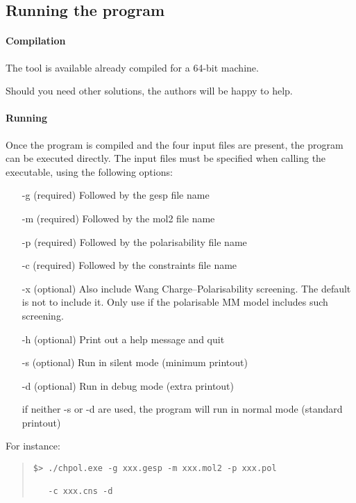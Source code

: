 \documentclass[a4paper]{report}
\begin{document}
\subsection*{Running the program}

\paragraph*{Compilation}

The tool is available already compiled for a 64-bit machine.

Should you need other solutions, the authors will be happy to help.

\paragraph*{Running}

Once the program is compiled and the four input files are present, the program can
be executed directly. The input files must be specified when calling the executable,
using the following options:
\begin{itemize}
\item[-g] (required) Followed by the gesp file name
\item[-m] (required) Followed by the mol2 file name
\item[-p] (required) Followed by the polarisability file name
\item[-c] (required) Followed by the constraints file name
\item[-x] (optional) Also include Wang Charge--Polarisability screening. The default is not to include it. Only use if the polarisable MM model includes such screening.
\item[-h] (optional) Print out a help message and quit
\item[-s] (optional) Run in silent mode (minimum printout)
\item[-d] (optional) Run in debug mode (extra printout)
\item[] if neither -s or -d are used, the program will run in normal mode (standard
printout)
\end{itemize}

For instance:
\begin{framed}
\begin{quote}
\begin{verbatim}
$> ./chpol.exe -g xxx.gesp -m xxx.mol2 -p xxx.pol 

   -c xxx.cns -d
\end{verbatim}
\end{quote}
\end{framed}
\end{document}
